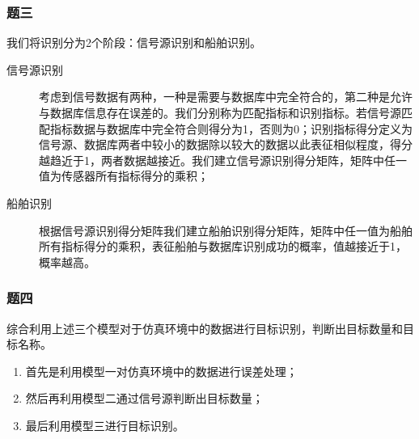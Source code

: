\subsubsection{题三}
我们将识别分为2个阶段：信号源识别和船舶识别。
\begin{description}
	\item[信号源识别]考虑到信号数据有两种，一种是需要与数据库中完全符合的，第二种是允许与数据库信息存在误差的。我们分别称为匹配指标和识别指标。若信号源匹配指标数据与数据库中完全符合则得分为1，否则为0；识别指标得分定义为信号源、数据库两者中较小的数据除以较大的数据以此表征相似程度，得分越趋近于1，两者数据越接近。我们建立信号源识别得分矩阵，矩阵中任一值为传感器所有指标得分的乘积；
	\item[船舶识别]根据信号源识别得分矩阵我们建立船舶识别得分矩阵，矩阵中任一值为船舶所有指标得分的乘积，表征船舶与数据库识别成功的概率，值越接近于1，概率越高。
\end{description}
\subsubsection{题四}
综合利用上述三个模型对于仿真环境中的数据进行目标识别，判断出目标数量和目标名称。
\begin{enumerate}
	\item 首先是利用模型一对仿真环境中的数据进行误差处理；
	\item 然后再利用模型二通过信号源判断出目标数量；
	\item 最后利用模型三进行目标识别。
\end{enumerate}
